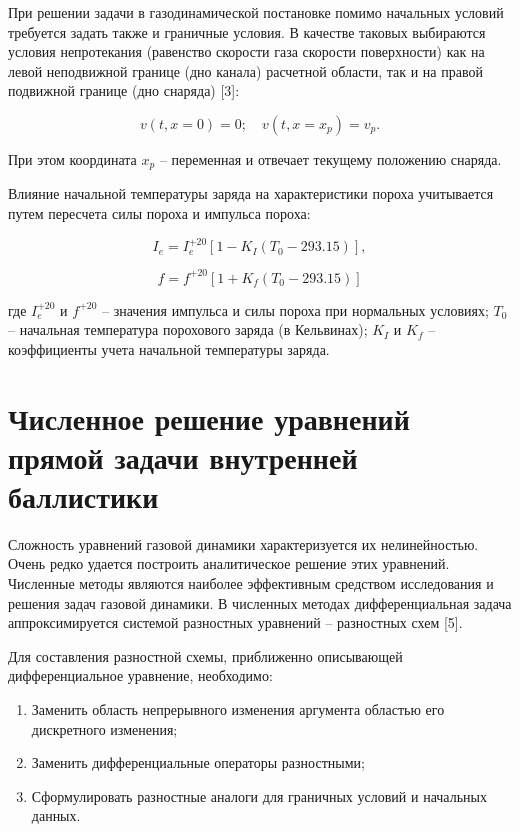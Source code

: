 \documentclass[14pt, a4paper]{extreport} %
\begin{document}
При решении задачи в газодинамической постановке помимо начальных условий требуется задать также и граничные условия. В качестве таковых выбираются условия непротекания (равенство скорости газа скорости поверхности) как на левой неподвижной границе (дно канала) расчетной области, так и на правой подвижной границе (дно снаряда) [3]:

\[
v(t, x = 0) = 0; \quad v(t, x = x_p) = v_p.
\]

При этом координата \( x_p \) -- переменная и отвечает текущему положению снаряда.

Влияние начальной температуры заряда на характеристики пороха учитывается путем пересчета силы пороха и импульса пороха:

\begin{equation}
I_e = I_e^{+20} \left[ 1 - K_I \left( T_0 - 293.15 \right) \right],
\end{equation}

\begin{equation}
f = f^{+20} \left[ 1 + K_f \left( T_0 - 293.15 \right) \right]
\end{equation}

где \( I_e^{+20} \) и \( f^{+20} \) -- значения импульса и силы пороха при нормальных условиях;  
\( T_0 \) -- начальная температура порохового заряда (в Кельвинах); \( K_I \) и \( K_f \) -- коэффициенты учета начальной температуры заряда.

\section{Численное решение уравнений прямой задачи внутренней баллистики}

Сложность уравнений газовой динамики характеризуется их нелинейностью. Очень редко удается построить аналитическое решение этих уравнений. Численные методы являются наиболее эффективным средством исследования и решения 
задач газовой динамики. В численных методах дифференциальная задача аппроксимируется системой разностных уравнений -- разностных схем [5].

Для составления разностной схемы, приближенно описывающей дифференциальное уравнение, необходимо:

\begin{enumerate}
    \item Заменить область непрерывного изменения аргумента областью его дискретного изменения;
    \item Заменить дифференциальные операторы разностными;
    \item Сформулировать разностные аналоги для граничных условий и начальных данных.
\end{enumerate}
\end{document}
